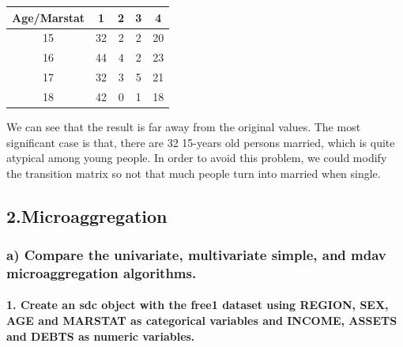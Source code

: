 \documentclass[
]{article}
\begin{document}
\begin{longtable}[]{@{}ccccc@{}}
\toprule()
Age/Marstat & 1 & 2 & 3 & 4 \\
\midrule()
\endhead
15 & 32 & 2 & 2 & 20 \\
16 & 44 & 4 & 2 & 23 \\
17 & 32 & 3 & 5 & 21 \\
18 & 42 & 0 & 1 & 18 \\
\bottomrule()
\end{longtable}

We can see that the result is far away from the original values. The
most significant case is that, there are 32 15-years old persons
married, which is quite atypical among young people. In order to avoid
this problem, we could modify the transition matrix so not that much
people turn into married when single.

\hypertarget{microaggregation}{%
\subsection{2.Microaggregation}\label{microaggregation}}

\hypertarget{a-compare-the-univariate-multivariate-simple-and-mdav-microaggregation-algorithms.}{%
\subsubsection{a) Compare the univariate, multivariate simple, and mdav
microaggregation
algorithms.}\label{a-compare-the-univariate-multivariate-simple-and-mdav-microaggregation-algorithms.}}

\hypertarget{create-an-sdc-object-with-the-free1-dataset-using-region-sex-age-and-marstat-as-categorical-variables-and-income-assets-and-debts-as-numeric-variables.}{%
\paragraph{1. Create an sdc object with the free1 dataset using REGION,
SEX, AGE and MARSTAT as categorical variables and INCOME, ASSETS and
DEBTS as numeric
variables.}\label{create-an-sdc-object-with-the-free1-dataset-using-region-sex-age-and-marstat-as-categorical-variables-and-income-assets-and-debts-as-numeric-variables.}}
\end{document}
